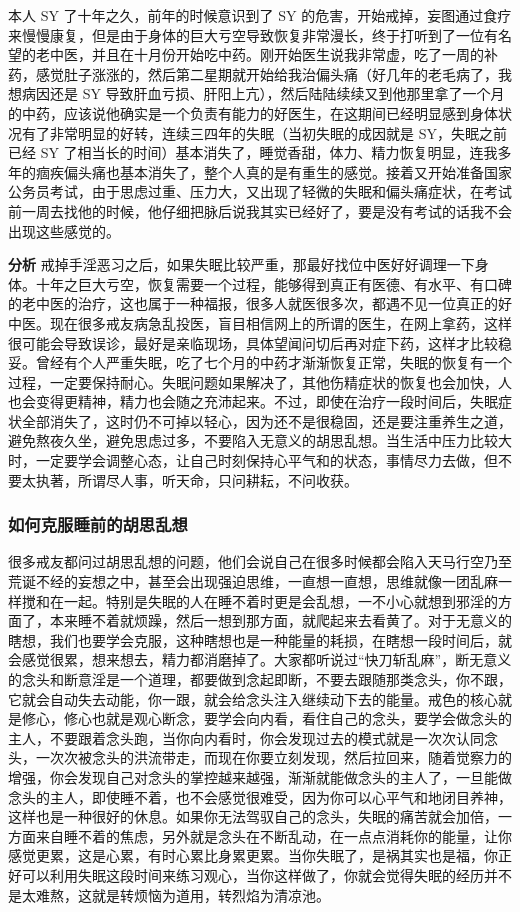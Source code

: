 \begin{case}
    本人 SY 了十年之久，前年的时候意识到了 SY 的危害，开始戒掉，妄图通过食疗来慢慢康复，但是由于身体的巨大亏空导致恢复非常漫长，终于打听到了一位有名望的老中医，并且在十月份开始吃中药。刚开始医生说我非常虚，吃了一周的补药，感觉肚子涨涨的，然后第二星期就开始给我治偏头痛（好几年的老毛病了，我想病因还是 SY 导致肝血亏损、肝阳上亢），然后陆陆续续又到他那里拿了一个月的中药，应该说他确实是一个负责有能力的好医生，在这期间已经明显感到身体状况有了非常明显的好转，连续三四年的失眠（当初失眠的成因就是 SY，失眠之前已经 SY 了相当长的时间）基本消失了，睡觉香甜，体力、精力恢复明显，连我多年的痼疾偏头痛也基本消失了，整个人真的是有重生的感觉。接着又开始准备国家公务员考试，由于思虑过重、压力大，又出现了轻微的失眠和偏头痛症状，在考试前一周去找他的时候，他仔细把脉后说我其实已经好了，要是没有考试的话我不会出现这些感觉的。

    \textbf{分析} 戒掉手淫恶习之后，如果失眠比较严重，那最好找位中医好好调理一下身体。十年之巨大亏空，恢复需要一个过程，能够得到真正有医德、有水平、有口碑的老中医的治疗，这也属于一种福报，很多人就医很多次，都遇不见一位真正的好中医。现在很多戒友病急乱投医，盲目相信网上的所谓的医生，在网上拿药，这样很可能会导致误诊，最好是亲临现场，具体望闻问切后再对症下药，这样才比较稳妥。曾经有个人严重失眠，吃了七个月的中药才渐渐恢复正常，失眠的恢复有一个过程，一定要保持耐心。失眠问题如果解决了，其他伤精症状的恢复也会加快，人也会变得更精神，精力也会随之充沛起来。不过，即使在治疗一段时间后，失眠症状全部消失了，这时仍不可掉以轻心，因为还不是很稳固，还是要注重养生之道，避免熬夜久坐，避免思虑过多，不要陷入无意义的胡思乱想。当生活中压力比较大时，一定要学会调整心态，让自己时刻保持心平气和的状态，事情尽力去做，但不要太执著，所谓尽人事，听天命，只问耕耘，不问收获。
\end{case}

\subsubsection{如何克服睡前的胡思乱想}

很多戒友都问过胡思乱想的问题，他们会说自己在很多时候都会陷入天马行空乃至荒诞不经的妄想之中，甚至会出现强迫思维，一直想一直想，思维就像一团乱麻一样搅和在一起。特别是失眠的人在睡不着时更是会乱想，一不小心就想到邪淫的方面了，本来睡不着就烦躁，然后一想到那方面，就爬起来去看黄了。对于无意义的瞎想，我们也要学会克服，这种瞎想也是一种能量的耗损，在瞎想一段时间后，就会感觉很累，想来想去，精力都消磨掉了。大家都听说过“快刀斩乱麻”，断无意义的念头和断意淫是一个道理，都要做到念起即断，不要去跟随那类念头，你不跟，它就会自动失去动能，你一跟，就会给念头注入继续动下去的能量。戒色的核心就是修心，修心也就是观心断念，要学会向内看，看住自己的念头，要学会做念头的主人，不要跟着念头跑，当你向内看时，你会发现过去的模式就是一次次认同念头，一次次被念头的洪流带走，而现在你要立刻发现，然后拉回来，随着觉察力的增强，你会发现自己对念头的掌控越来越强，渐渐就能做念头的主人了，一旦能做念头的主人，即使睡不着，也不会感觉很难受，因为你可以心平气和地闭目养神，这样也是一种很好的休息。如果你无法驾驭自己的念头，失眠的痛苦就会加倍，一方面来自睡不着的焦虑，另外就是念头在不断乱动，在一点点消耗你的能量，让你感觉更累，这是心累，有时心累比身累更累。当你失眠了，是祸其实也是福，你正好可以利用失眠这段时间来练习观心，当你这样做了，你就会觉得失眠的经历并不是太难熬，这就是转烦恼为道用，转烈焰为清凉池。

